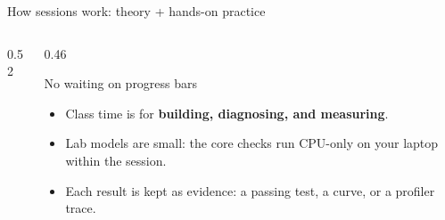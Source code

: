 \documentclass[handout]{beamer}
\begin{document}
\begin{frame}{How sessions work: theory + hands-on practice}
  \begin{columns}[c]
    \begin{column}{0.52\linewidth}
      \vspace{6pt}
    \end{column}
    \begin{column}{0.46\linewidth}
      \begin{block}{No waiting on progress bars}
        \begin{itemize}
            \setlength{\itemsep}{6pt}
          \item Class time is for \textbf{building, diagnosing, and measuring}.
          \item Lab models are small: the core checks run CPU-only on your laptop within the session.
          \item Each result is kept as evidence: a passing test, a curve, or a profiler trace.
        \end{itemize}
      \end{block}
    \end{column}
  \end{columns}
\end{frame}
\end{document}

